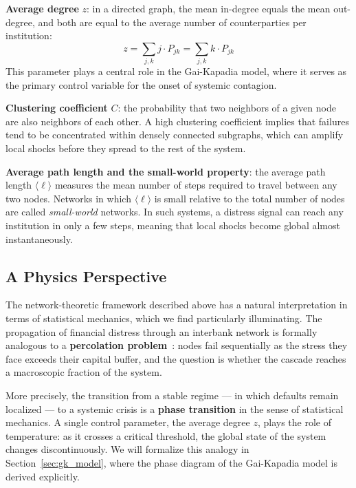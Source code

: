 \documentclass[a4paper,12pt,twoside]{article}
\begin{document}
\textbf{Average degree} $z$: in a directed graph, the mean in-degree 
equals the mean out-degree, and both are equal to the average number of 
counterparties per institution:
\begin{equation}
    z = \sum_{j,k} j \cdot P_{jk} = \sum_{j,k} k \cdot P_{jk}
    \label{eq:avg_degree}
\end{equation}
This parameter plays a central role in the Gai-Kapadia model, where it 
serves as the primary control variable for the onset of systemic 
contagion.

\textbf{Clustering coefficient} $C$: the probability that two neighbors 
of a given node are also neighbors of each other. A high clustering 
coefficient implies that failures tend to be concentrated within 
densely connected subgraphs, which can amplify local shocks before they 
spread to the rest of the system.

\textbf{Average path length and the small-world property}: the average 
path length $\langle \ell \rangle$ measures the mean number of steps 
required to travel between any two nodes. Networks in which $\langle 
\ell \rangle$ is small relative to the total number of nodes are called 
\textit{small-world} networks. In such systems, a distress signal can 
reach any institution in only a few steps, meaning that local shocks 
become global almost instantaneously.
\subsection{A Physics Perspective}
\label{sec:physics_perspective}
The network-theoretic framework described above has a natural 
interpretation in terms of statistical mechanics, which we find 
particularly illuminating. The propagation of financial distress through 
an interbank network is formally analogous to a \textbf{percolation 
problem}~\cite{bardoscia2021}: nodes fail sequentially as the stress they face exceeds their 
capital buffer, and the question is whether the cascade reaches a 
macroscopic fraction of the system.

More precisely, the transition from a stable regime --- in which defaults 
remain localized --- to a systemic crisis is a \textbf{phase transition} 
in the sense of statistical mechanics. A single control parameter, the 
average degree $z$, plays the role of temperature: as it crosses a 
critical threshold, the global state of the system changes 
discontinuously. We will formalize this analogy in 
Section~\ref{sec:gk_model}, where the phase diagram of the 
Gai-Kapadia model is derived explicitly.
\end{document}
